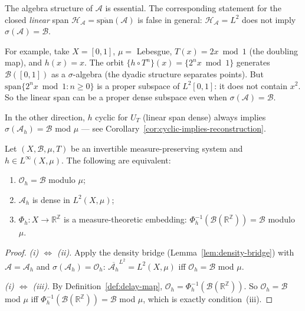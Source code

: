 \begin{remark}
\label{rem:algebra-necessary}
The algebra structure of $\mathcal{A}$ is essential.  The corresponding
statement for the closed \emph{linear} span $\mathcal{H}_{\mathcal{A}} =
\overline{\mathrm{span}}(\mathcal{A})$ is false in general:
$\mathcal{H}_{\mathcal{A}} = L^2$ does not imply
$\sigma(\mathcal{A}) = \mathcal{B}$.

For example, take $X = [0,1]$, $\mu = $ Lebesgue, $T(x) = 2x \bmod 1$ (the
doubling map), and $h(x) = x$.  The orbit $\{h \circ T^n\}(x) = \{2^n x \bmod 1\}$
generates $\mathcal{B}([0,1])$ as a $\sigma$-algebra (the dyadic structure separates
points).  But $\mathrm{span}\{2^n x \bmod 1 : n \geq 0\}$ is a proper subspace of
$L^2[0,1]$: it does not contain $x^2$.  So the linear span can be a proper dense
subspace even when $\sigma(\mathcal{A}) = \mathcal{B}$.

In the other direction, $h$ cyclic for $U_T$ (linear span dense) always implies
$\sigma(\mathcal{A}_h) = \mathcal{B}$ mod $\mu$ — see Corollary~\ref{cor:cyclic-implies-reconstruction}.
\end{remark}

\begin{theorem}
\label{thm:reconstruction}
Let $(X, \mathcal{B}, \mu, T)$ be an invertible measure-preserving system and
$h \in L^\infty(X, \mu)$.  The following are equivalent:
\begin{enumerate}[label=(\roman*)]
  \item $\mathcal{O}_h = \mathcal{B}$ modulo $\mu$;
  \item $\mathcal{A}_h$ is dense in $L^2(X, \mu)$;
  \item $\Phi_h : X \to \mathbb{R}^\mathbb{Z}$ is a measure-theoretic embedding:
    $\Phi_h^{-1}(\mathcal{B}(\mathbb{R}^\mathbb{Z})) = \mathcal{B}$ modulo $\mu$.
\end{enumerate}
\end{theorem}

\begin{proof}
\emph{(i) $\Leftrightarrow$ (ii).}
Apply the density bridge (Lemma~\ref{lem:density-bridge}) with
$\mathcal{A} = \mathcal{A}_h$ and $\sigma(\mathcal{A}_h) = \mathcal{O}_h$:
$\overline{\mathcal{A}_h}^{L^2} = L^2(X, \mu)$ iff $\mathcal{O}_h = \mathcal{B}$
mod $\mu$.

\emph{(i) $\Leftrightarrow$ (iii).}
By Definition~\ref{def:delay-map},
$\mathcal{O}_h = \Phi_h^{-1}(\mathcal{B}(\mathbb{R}^\mathbb{Z}))$.
So $\mathcal{O}_h = \mathcal{B}$ mod $\mu$ iff
$\Phi_h^{-1}(\mathcal{B}(\mathbb{R}^\mathbb{Z})) = \mathcal{B}$ mod $\mu$,
which is exactly condition~(iii).
\end{proof}

